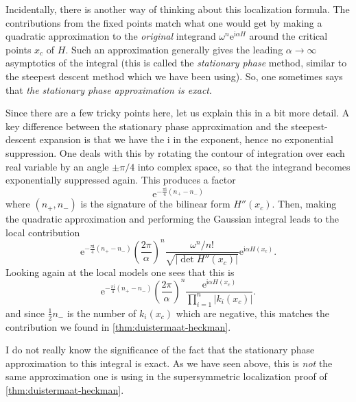 \documentclass[12pt,letterpaper,reqno]{article}
\numberwithin{equation}{section}
\newcommand{\half}{\ensuremath{\frac{1}{2}}}
\newcommand{\I}{{\mathrm i}}
\newcommand{\e}{{\mathrm e}}
\newcommand{\abs}[1]{\lvert#1\rvert}
\newcommand{\ti}[1]{\textit{#1}}
\begin{document}
Incidentally,
there is another way of thinking about 
this localization formula. The 
contributions from the fixed points match
what one would get
by making a quadratic approximation to the \ti{original} integrand 
$\omega^n \e^{\I \alpha H}$
around the critical points $x_c$
of $H$. Such an approximation generally gives the leading $\alpha \to \infty$
asymptotics of the integral (this is called the \ti{stationary phase} method,
similar to the steepest descent method which we have been using).
So, one sometimes says that \ti{the stationary phase approximation is exact}.

Since there are a few tricky points here, let us explain this in a bit more detail.
A key difference between the stationary phase approximation and
the steepest-descent expansion is that we have the
$\I$ in the exponent, hence no exponential suppression. 
One deals with this by rotating the contour of
integration over each real variable by an angle $\pm \pi/4$
into complex space, so that the integrand
becomes exponentially suppressed again.
This produces a factor
\begin{equation}
  \e^{-\frac{\pi \I}{4} (n_+ - n_-)}
\end{equation}
where $(n_+,n_-)$ is the signature of 
the bilinear form $H''(x_c)$.
Then, making the quadratic approximation and performing the Gaussian integral 
leads to the local contribution
\begin{equation}
  \e^{-\frac{\pi \I}{4} (n_+ - n_-)} \left( \frac{2 \pi}{\alpha} \right)^n
\frac{\omega^n/n!}{\sqrt{\abs{\det H''(x_c)}}} \e^{\I \alpha H(x_c)}.
\end{equation}
Looking again at the local models one sees that this is
\begin{equation}
  \e^{-\frac{\pi \I}{4} (n_+ - n_-)} \left( \frac{2 \pi}{\alpha} \right)^n
\frac{\e^{\I \alpha H(x_c)}}{\prod_{i=1}^n \abs{k_i(x_c)}}.
\end{equation}
and since $\half n_-$ is the number of $k_i(x_c)$ which are negative, this
matches the contribution we found in \autoref{thm:duistermaat-heckman}.

I do not really know the significance of the fact that the stationary phase
approximation to this integral is exact. As we have seen above, this is \ti{not}
the same approximation one is using in the supersymmetric localization proof
of \autoref{thm:duistermaat-heckman}.

\end{document}
